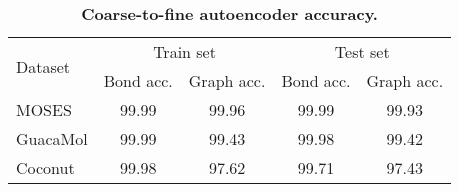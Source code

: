 \begin{table}[h!]
\centering

{

\begin{tabular}{l|cc|cc}
\toprule

\multirow{2}{*}{Dataset} &
\multicolumn{2}{c|}{Train set} &
\multicolumn{2}{c}{Test set} \\

&
Bond acc. &
Graph acc. &
Bond acc. & 
Graph acc. \\

\midrule
MOSES &
99.99 &
99.96 &
99.99 & 
99.93 \\

GuacaMol &
99.99 &
99.43 &
99.98 & 
99.42 \\

Coconut &
99.98 &
97.62 &
99.71 & 
97.43 \\

\bottomrule

\end{tabular}

}

\caption{\textbf{Coarse-to-fine autoencoder accuracy.}}
\label{tab:ae_accuracy}
\end{table}